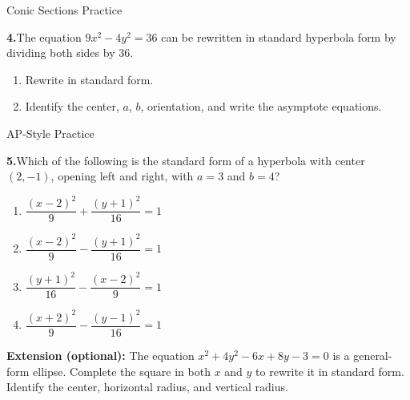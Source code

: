\documentclass[10pt]{article}
\begin{document}
\begin{notesbox}{Conic Sections Practice}

\vspace{6pt}
\textbf{4.}\quad The equation $9x^2 - 4y^2 = 36$ can be rewritten in standard hyperbola
form by dividing both sides by 36.
\begin{enumerate}[label=(\alph*), leftmargin=2em, itemsep=4pt]
  \item Rewrite in standard form.
  \item Identify the center, $a$, $b$, orientation, and write the asymptote equations.
\end{enumerate}

\end{notesbox}

\vspace{0.08in}

\begin{notesbox}{AP-Style Practice}

\textbf{5.}\quad Which of the following is the standard form of a hyperbola with center
$(2, -1)$, opening left and right, with $a = 3$ and $b = 4$?

\vspace{6pt}
\begin{enumerate}[label=(\Alph*), leftmargin=2em, itemsep=4pt]
  \item $\dfrac{(x-2)^2}{9} + \dfrac{(y+1)^2}{16} = 1$
  \item $\dfrac{(x-2)^2}{9} - \dfrac{(y+1)^2}{16} = 1$
  \item $\dfrac{(y+1)^2}{16} - \dfrac{(x-2)^2}{9} = 1$
  \item $\dfrac{(x+2)^2}{9} - \dfrac{(y-1)^2}{16} = 1$
\end{enumerate}

\end{notesbox}

\vspace{0.08in}

\begin{extensionbox}
\textbf{Extension (optional):} The equation $x^2 + 4y^2 - 6x + 8y - 3 = 0$ is
a general-form ellipse. Complete the square in both $x$ and $y$ to rewrite it in
standard form. Identify the center, horizontal radius, and vertical radius.
\end{extensionbox}
\end{document}
